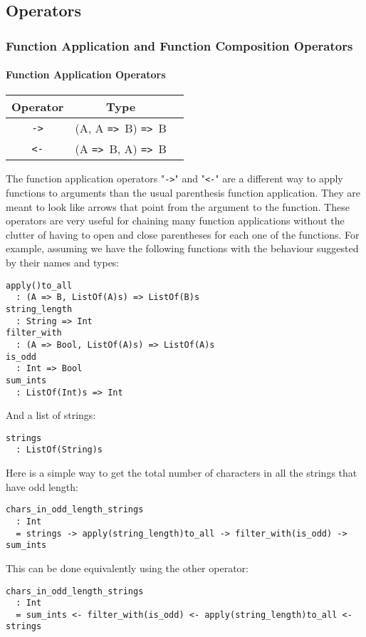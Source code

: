 \documentclass{article}
\def\ra{\texttt{=>}\ }
\begin{document}
\subsection{Operators}

\subsubsection{Function Application and Function Composition Operators}

\paragraph{Function Application Operators}

\begin{center}
\begin{tabular}{ |c|c|c| } 
\hline
Operator & Type \\ 
\hline
\hline
\texttt{->} & (A, A \ra B) \ra B \\
\hline
\texttt{<-} & (A \ra B, A) \ra B \\
\hline
\end{tabular}
\end{center}
The function application operators "\texttt{->}" and "\texttt{<-}" are a
different way to apply functions to arguments than the usual parenthesis
function application.  They are meant to look like arrows that point from the
argument to the function.  These operators are very useful for chaining many
function applications without the clutter of having to open and close
parentheses for each one of the functions.  For example, assuming we have the
following functions with the behaviour suggested by their names and types:
\begin{verbatim}
apply()to_all
  : (A => B, ListOf(A)s) => ListOf(B)s
string_length
  : String => Int
filter_with
  : (A => Bool, ListOf(A)s) => ListOf(A)s
is_odd
  : Int => Bool
sum_ints
  : ListOf(Int)s => Int
\end{verbatim}
And a list of strings:
\begin{verbatim}
strings
  : ListOf(String)s
\end{verbatim}
Here is a simple way to get the total number of characters in all the strings
that have odd length:
\begin{verbatim}
chars_in_odd_length_strings
  : Int
  = strings -> apply(string_length)to_all -> filter_with(is_odd) -> sum_ints
\end{verbatim}
This can be done equivalently using the other operator:
\begin{verbatim}
chars_in_odd_length_strings
  : Int
  = sum_ints <- filter_with(is_odd) <- apply(string_length)to_all <- strings

\end{verbatim}
\end{document}

